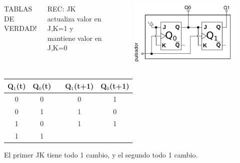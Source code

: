 \documentclass[10pt]{beamer}
\begin{document}
\begin{frame}
{\begin{columns}
\begin{mdframed}[backgroundcolor=frenchblue!20]
  TABLAS DE VERDAD!
\end{mdframed}
\vspace{0.15cm}
REC: JK actualiza valor en J,K=1 y mantiene valor en J,K=0
\begin{figure}[h!]
    \centering
    \includegraphics[scale=0.23]{circuito.png}
\end{figure}
\end{columns}
\begin{table}[h!]
\begin{tabular}{|c|c|c|c|c|}
\hline
Q$_1$(t) & Q$_0$(t) &  & Q$_1$(t+1) & Q$_0$(t+1) \\ \hline
0        & 0        &  & 0          & 1          \\ \hline
0        & 1        &  & 1          & 0          \\ \hline
1        & 0        &  & 1          & 1          \\ \hline
1        & 1        &  &           &           \\ \hline
\end{tabular}
\end{table}El primer JK tiene todo 1 cambio, y el segundo todo 1 cambio.}
\end{frame}
\end{document}
